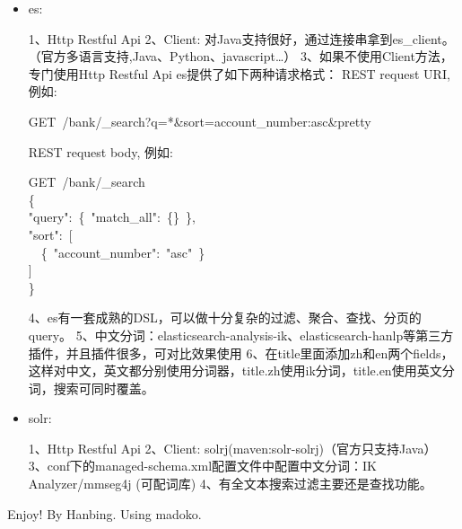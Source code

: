 \documentclass{article}
\begin{document}
\begin{itemize}%

\item{}
es:     %

1、Http Restful Api    \mdbr
{}2、Client: 对Java支持很好，通过连接串拿到es\_client。（官方多语言支持,Java、Python、javascript\dots{}）    \mdbr
{}3、如果不使用Client方法，专门使用Http Restful Api
es提供了如下两种请求格式：    \mdbr
{}REST request URI, 例如:     %
\begin{mdpre}%
\noindent GET~{/}{b}{a}{n}{k}{/}\_search?q=*\&sort=account\_number:asc\&pretty%
\end{mdpre}
REST request body, 例如:%
\begin{mdpre}%
\noindent GET~{/}{b}{a}{n}{k}{/}\_search\\
\{\\
{"}{query}{"}:~\{~{"}{match\_all}{"}:~\{\}~\},\\
{"}{sort}{"}:~{}[\\
~~\{~{"}{account\_number}{"}:~{"}{asc}{"}~\}\\
]\\
\}%
\end{mdpre}
4、es有一套成熟的DSL，可以做十分复杂的过滤、聚合、查找、分页的query。    \mdbr
{}5、中文分词：elasticsearch-analysis-ik、elasticsearch-hanlp等第三方插件，并且插件很多，可对比效果使用    \mdbr
{}6、在title里面添加zh和en两个fields，这样对中文，英文都分别使用分词器，title.zh使用ik分词，title.en使用英文分词，搜索可同时覆盖。%

\item{}
solr:%

1、Http Restful Api    \mdbr
{}2、Client: solrj(maven:solr-solrj)（官方只支持Java）    \mdbr
{}3、conf下的managed-schema.xml配置文件中配置中文分词：IK Analyzer/mmseg4j   (可配词库)    \mdbr
{}4、有全文本搜索过滤主要还是查找功能。%
\end{itemize}%

\noindent{}Enjoy! By Hanbing.    \mdbr
{}Using madoko.%
\end{document}
